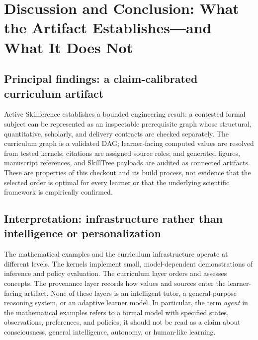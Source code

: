 \documentclass[
  english,
]{article}
\begin{document}
\newpage

\section{Discussion and Conclusion: What the Artifact Establishes---and
What It Does
Not}\label{discussion-and-conclusion-what-the-artifact-establishesand-what-it-does-not}

\subsection{Principal findings: a claim-calibrated curriculum
artifact}\label{principal-findings-a-claim-calibrated-curriculum-artifact}

Active Skillference establishes a bounded engineering result: a
contested formal subject can be represented as an inspectable
prerequisite graph whose structural, quantitative, scholarly, and
delivery contracts are checked separately. The curriculum graph is a
validated DAG; learner-facing computed values are resolved from tested
kernels; citations are assigned source roles; and generated figures,
manuscript references, and SkillTree payloads are audited as connected
artifacts. These are properties of this checkout and its build process,
not evidence that the selected order is optimal for every learner or
that the underlying scientific framework is empirically confirmed.

\subsection{Interpretation: infrastructure rather than intelligence or
personalization}\label{interpretation-infrastructure-rather-than-intelligence-or-personalization}

The mathematical examples and the curriculum infrastructure operate at
different levels. The kernels implement small, model-dependent
demonstrations of inference and policy evaluation. The curriculum layer
orders and assesses concepts. The provenance layer records how values
and sources enter the learner-facing artifact. None of these layers is
an intelligent tutor, a general-purpose reasoning system, or an adaptive
learner model. In particular, the term \emph{agent} in the mathematical
examples refers to a formal model with specified states, observations,
preferences, and policies; it should not be read as a claim about
consciousness, general intelligence, autonomy, or human-like learning.
\end{document}

